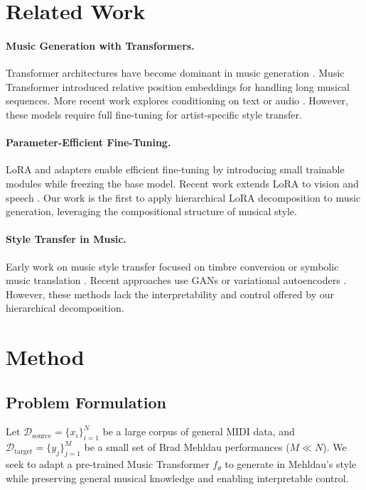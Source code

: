 \documentclass{article}
\begin{document}
\section{Related Work}

\paragraph{Music Generation with Transformers.}
Transformer architectures have become dominant in music generation \cite{huang2018music, payne2019musenet, dhariwal2020jukebox}. Music Transformer \cite{huang2018music} introduced relative position embeddings for handling long musical sequences. More recent work explores conditioning on text \cite{donahue2023musiclm} or audio \cite{agostinelli2023musicgen}. However, these models require full fine-tuning for artist-specific style transfer.

\paragraph{Parameter-Efficient Fine-Tuning.}
LoRA \cite{hu2021lora} and adapters \cite{houlsby2019parameter} enable efficient fine-tuning by introducing small trainable modules while freezing the base model. Recent work extends LoRA to vision \cite{zhang2023adalora} and speech \cite{guo2023lora}. Our work is the first to apply hierarchical LoRA decomposition to music generation, leveraging the compositional structure of musical style.

\paragraph{Style Transfer in Music.}
Early work on music style transfer focused on timbre conversion \cite{mor2018universal} or symbolic music translation \cite{brunner2018midi}. Recent approaches use GANs \cite{yang2019deep} or variational autoencoders \cite{roberts2018hierarchical}. However, these methods lack the interpretability and control offered by our hierarchical decomposition.

\section{Method}

\subsection{Problem Formulation}

Let $\mathcal{D}_{\text{source}} = \{x_i\}_{i=1}^N$ be a large corpus of general MIDI data, and $\mathcal{D}_{\text{target}} = \{y_j\}_{j=1}^M$ be a small set of Brad Mehldau performances ($M \ll N$). We seek to adapt a pre-trained Music Transformer $f_\theta$ to generate in Mehldau's style while preserving general musical knowledge and enabling interpretable control.
\end{document}
